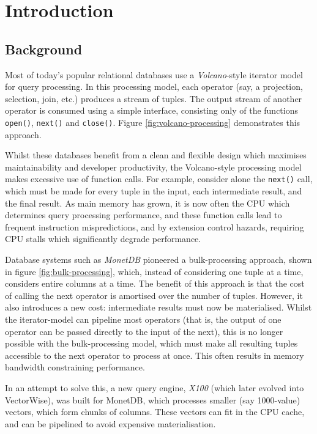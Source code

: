 \chapter{Introduction}

\section{Background}

Most of today's popular relational databases use a \emph{Volcano}-style iterator model \cite{Graefe:1994:VEP:627290.627558} for query processing. In this processing model, each operator (say, a projection, selection, join, etc.) produces a stream of tuples. The output stream of another operator is consumed using a simple interface, consisting only of the functions \texttt{open()}, \texttt{next()} and \texttt{close()}. Figure \ref{fig:volcano-processing} demonstrates this approach.

Whilst these databases benefit from a clean and flexible design which maximises maintainability and developer productivity, the Volcano-style processing model makes excessive use of function calls. For example, consider alone the \texttt{next()} call, which must be made for every tuple in the input, each intermediate result, and the final result. As main memory has grown, it is now often the CPU which determines query processing performance, and these function calls lead to frequent instruction mispredictions, and by extension control hazards, requiring CPU stalls which significantly degrade performance.

Database systems such as \emph{MonetDB} \cite{Boncz:2008:BMW:1409360.1409380} pioneered a bulk-processing approach, shown in figure \ref{fig:bulk-processing}, which, instead of considering one tuple at a time, considers entire columns at a time. The benefit of this approach is that the cost of calling the next operator is amortised over the number of tuples. However, it also introduces a new cost: intermediate results must now be materialised. Whilst the iterator-model can pipeline most operators (that is, the output of one operator can be passed directly to the input of the next), this is no longer possible with the bulk-processing model, which must make all resulting tuples accessible to the next operator to process at once. This often results in memory bandwidth constraining performance.

In an attempt to solve this, a new query engine, \emph{X100} \cite{DBLP:conf/cidr/BonczZN05} (which later evolved into VectorWise), was built for MonetDB, which processes smaller (say 1000-value) vectors, which form chunks of columns. These vectors can fit in the CPU cache, and can be pipelined to avoid expensive materialisation.

